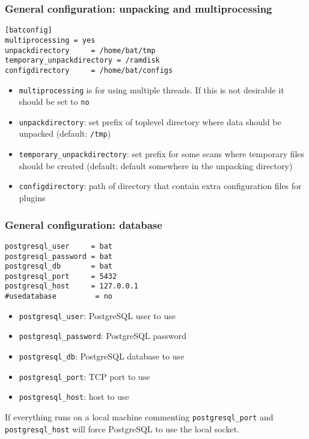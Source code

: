 \documentclass[11pt]{beamer}
\begin{document}
\begin{frame}[fragile]
\frametitle{General configuration: unpacking and multiprocessing}

\begin{verbatim}
[batconfig]
multiprocessing = yes
unpackdirectory     = /home/bat/tmp
temporary_unpackdirectory = /ramdisk
configdirectory     = /home/bat/configs
\end{verbatim}

\begin{itemize}
\item \texttt{multiprocessing} is for using multiple threads. If this is not desirable it should be set to \texttt{no}
\item \texttt{unpackdirectory}: set prefix of toplevel directory where data should be unpacked (default: \texttt{/tmp})
\item \texttt{temporary\_unpackdirectory}: set prefix for some scans where temporary files should be created (default: default somewhere in the unpacking directory)
\item \texttt{configdirectory}: path of directory that contain extra configuration files for plugins
\end{itemize}

\end{frame}

\begin{frame}[fragile]
\frametitle{General configuration: database}

\begin{verbatim}
postgresql_user     = bat
postgresql_password = bat
postgresql_db       = bat
postgresql_port     = 5432
postgresql_host     = 127.0.0.1
#usedatabase         = no
\end{verbatim}

\begin{itemize}
\item \texttt{postgresql\_user}: PostgreSQL user to use
\item \texttt{postgresql\_password}: PostgreSQL password
\item \texttt{postgresql\_db}: PostgreSQL database to use
\item \texttt{postgresql\_port}: TCP port to use
\item \texttt{postgresql\_host}: host to use
\end{itemize}

If everything runs on a local machine commenting \texttt{postgresql\_port} and \texttt{postgresql\_host} will force PostgreSQL to use the local socket.
\end{frame}
\end{document}
